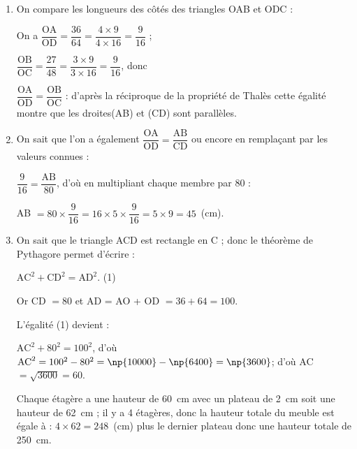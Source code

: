 
\medskip

\begin{enumerate}
\item On compare les longueurs des côtés des triangles OAB et ODC :

On a $\dfrac{\text{OA}}{\text{OD}} = \dfrac{36}{64} = \dfrac{4 \times 9}{4 \times 16} = \dfrac{9}{16}$ ;

$\dfrac{\text{OB}}{\text{OC}} = \dfrac{27}{48} = \dfrac{3 \times 9}{3 \times 16} = \dfrac{9}{16}$, donc 

$\dfrac{\text{OA}}{\text{OD}} = \dfrac{\text{OB}}{\text{OC}}$ : d'après la réciproque de la propriété de Thalès cette égalité montre que les droites(AB) et (CD) sont parallèles.
\item On sait que l'on a également $\dfrac{\text{OA}}{\text{OD}} =\dfrac{\text{AB}}{\text{CD}}$ ou encore en remplaçant par les valeurs connues :

$\dfrac{9}{16} = \dfrac{\text{AB}}{80}$, d'où en multipliant chaque membre par 80 : 

AB $ = 80 \times \dfrac{9}{16} = 16 \times 5 \times \dfrac{9}{16} = 5 \times 9 = 45$~(cm).
\item On sait que le triangle ACD est rectangle en C ; donc le théorème de Pythagore permet d'écrire :

$\text{AC}^2 + \text{CD}^2 = \text{AD}^2$. \quad (1)

Or CD $ = 80$ et AD = AO + OD $= 36 + 64 = 100$.

L'égalité (1) devient :

$\text{AC}^2 + 80^2 = 100^2$, d'où $\text{AC}^2 = 100^2 - 80^2 = \np{10000} - \np{6400} = \np{3600}$; d'où AC $ = \sqrt{3600} = 60$.

Chaque étagère a une hauteur de 60~cm avec un plateau de 2~cm soit une hauteur de 62~cm ; il y a 4 étagères, donc la hauteur totale du meuble est égale à : $4 \times 62 = 248$~(cm) plus le dernier plateau donc une hauteur totale de 250~cm.
\end{enumerate}

\vspace{0,5cm}

